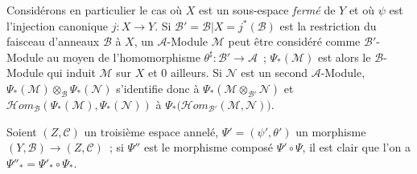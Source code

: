 \begin{env}[4.2.5]
\label{0.4.2.5-fr}
Considérons en particulier le cas où $X$ est un sous-espace \emph{fermé} de
$Y$ et où $\psi$ est l'injection canonique $j:X\to Y$. Si
$\mathcal{B}'=\mathcal{B}|X=j^*(\mathcal{B})$ est la restriction du faisceau
d'anneaux $\mathcal{B}$ à $X$, un $\mathcal{A}$-Module $\mathcal{M}$ peut
être considéré comme $\mathcal{B}'$-Module au moyen de l'homomorphisme
$\theta^\sharp:\mathcal{B}'\to\mathcal{A}$~; $\Psi_*(\mathcal{M})$ est alors
le $\mathcal{B}$-Module qui induit $\mathcal{M}$ sur $X$ et $0$ ailleurs. Si
$\mathcal{N}$ est un second $\mathcal{A}$-Module,
$\Psi_*(\mathcal{M})\otimes_{\mathcal{B}}\Psi_*(\mathcal{N})$ s'identifie
donc à $\Psi_*(\mathcal{M}\otimes_{\mathcal{B}'}\mathcal{N})$ et
$\mathcal{H}\!om_{\mathcal{B}}(\Psi_*(\mathcal{M}),\Psi_*(\mathcal{N}))$
à
$\Psi_*\bigl(\mathcal{H}\!om_{\mathcal{B}'}(\mathcal{M},\mathcal{N})\bigr)$.
\end{env}

\begin{env}[4.2.6]
\label{0.4.2.6-fr}
Soient $(Z,\mathcal{C})$ un troisième espace annelé,
$\Psi'=(\psi',\theta')$ un morphisme
$(Y,\mathcal{B})\to(Z,\mathcal{C})$~; si $\Psi''$ est le morphisme composé
$\Psi'\circ\Psi$, il est clair que l'on a
$\Psi''_*=\Psi'_*\circ\Psi_*$.
\end{env}

